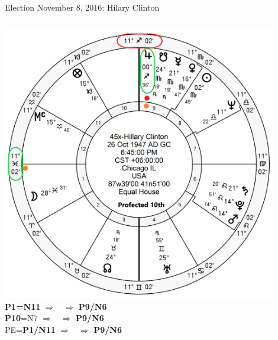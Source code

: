 \begin{frame}[t]{Election November 8, 2016: Hilary Clinton}
\begin{columns}[T, onlytextwidth]
\vspace{-1em}
{\includegraphics[width=0.9\textwidth]{charts/Hillary-Prof-10th.png}}
\fontsize{8pt}{9pt}\selectfont
\textbf{\dgreen P1=N11}
	$\Rightarrow$ \Jupiter\, $\Rightarrow$ \textbf{\dgreen P9/N6}\\
\textbf{\red P10}=N7
	$\Rightarrow$ \Jupiter\, $\Rightarrow$ \textbf{\dgreen P9/N6}\\
PE=\textbf{\dgreen P1/N11}
	 $\Rightarrow$ \Jupiter\, $\Rightarrow$ \textbf{\dgreen P9/N6}

\end{columns}
\end{frame}
